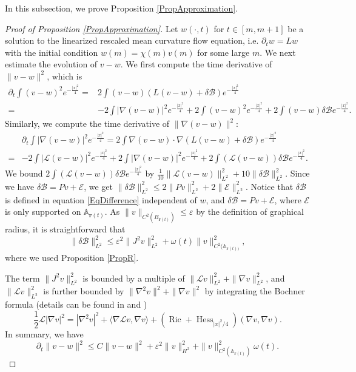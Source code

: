 \documentclass[11pt]{amsart}
\numberwithin{equation}{section}
\numberwithin{equation}{section}
\newcommand{\eps}{\varepsilon}
\newcommand{\dt}{\delta}
\newcommand{\br}{\mathbf{r}}
\newcommand{\cB}{\mathcal{B}}
\newcommand{\cL}{\mathcal{L}}
\newcommand{\A}{\mathbb{A}}
\newcommand{\pr}{\partial}
\DeclareMathOperator{\Ric}{Ric}
\DeclareMathOperator{\Hess}{Hess}
\begin{document}
	In this subsection, we prove Proposition \ref{PropApproximation}. 
	
	\begin{proof}[Proof of Proposition \ref{PropApproximation}]
		
		Let $w(\cdot,t)$ for $t\in[m,m+1]$ be a solution to the linearized rescaled mean curvature flow equation, i.e. $\pr_t w=Lw$ with the initial condition $w(m)=\chi(m)v(m)$ for some large $m$. We next estimate the evolution of $v-w$. We first compute the time derivative of $\|v-w\|^2$, which is
		\begin{equation*}
			\begin{split}
				\pr_t\int (v-w)^2 e^{-\frac{|x|^2}{4}}
				=&
				2\int (v-w)(L(v-w)+\dt\cB) e^{-\frac{|x|^2}{4}}
				\\
				=&
				-2\int |\nabla(v-w)|^2e^{-\frac{|x|^2}{4}}
				+2\int (v-w)^2e^{-\frac{|x|^2}{4}}
				+2 \int (v-w)\dt\cB e^{-\frac{|x|^2}{4}}.
			\end{split}
		\end{equation*}
		Similarly, we compute the time derivative of $\|\nabla(v-w)\|^2$:
		\begin{equation}\label{EqEnergy}
			\begin{split}
				&\pr_t\int |\nabla (v-w)|^2 e^{-\frac{|x|^2}{4}}
				=
				2\int \nabla(v-w)\cdot\nabla(L(v-w)+\dt\cB )e^{-\frac{|x|^2}{4}}
				\\
				=&
				-2\int |\cL(v-w)|^2e^{-\frac{|x|^2}{4}}
				+2\int |\nabla(v-w)|^2e^{-\frac{|x|^2}{4}}
				+2 \int (\cL(v-w))\dt\cB e^{-\frac{|x|^2}{4}}.
			\end{split}
		\end{equation}
		We bound $2\int (\cL(v-w))\dt\cB e^{-\frac{|x|^2}{4}}$ by $\frac{1}{10}\|\cL(v-w)\|_{L^2}^2+10\|\dt \cB\|^2_{L^2}$. 
		Since we have $\dt\cB=Pv+\mathcal E$, we get $\|\dt \cB\|^2_{L^2}\leq 2\|Pv\|^2_{L^2}+2\|\mathcal E\|^2_{L^2}$. 	
		Notice that $\dt\cB$ is defined in equation \eqref{EqDifference} independent of $w$, and $\dt \mathcal B=Pv+\mathcal E$, where $\mathcal E$ is only supported on $\A_{\br(t)}$. As $\|v\|_{C^2(B_{\br(t)})}\leq \eps$ by the definition of graphical radius, it is straightforward that 
		\begin{equation}\label{eq:cB L_2}
			\|\dt\cB\|_{L^2}^2\leq \eps^2\|J^2 v\|_{L^2}^2+\omega(t) \|v\|^2_{C^2(\mathbb A_{\br(t))}},
		\end{equation}
		where we used Proposition \ref{PropR}.
		
		The term $\|J^2v\|_{L^2}^2$ is bounded by a multiple of $\|\mathcal L v\|_{L^2}^2+\|\nabla v\|_{L^2}^2$, and $\|\mathcal L v\|_{L^2}^2$ is further bounded by $\|\nabla^2 v\|^2+\|\nabla v\|^2$ by integrating the Bochner formula (details can be found in \cite[Section 5]{CM3} and \cite[Proposition 4.6]{SX3})
		\[
		\frac{1}{2}\cL|\nabla v|^2=|\nabla^2 v|^2+\langle \nabla\cL v,\nabla v\rangle +(\Ric+\Hess_{|x|^2/4})(\nabla v,\nabla v).
		\]
		In summary, we have
		\begin{equation}\label{eq:LinearApproxWithoutAnnBound}
			\pr_t\|v-w\|^2\leq C\|v-w\|^2+\eps^2\|v\|_{H^2}^2+\|v\|^2_{C^2(\mathbb A_{\br(t)})} \omega(t).
		\end{equation}
		

\end{proof}
\end{document}

